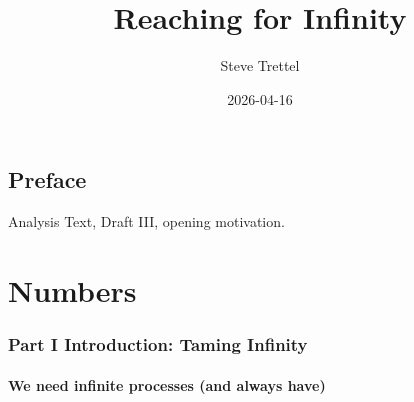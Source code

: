 \documentclass[
  10pt,
  letterpaper,
]{scrbook}
\title{Reaching for Infinity}
\author{Steve Trettel}
\date{2026-04-16}
\renewcommand*\contentsname{Table of contents}
\newcommand\contentsname{Table of contents}
\begin{document}
\frontmatter
\maketitle

\renewcommand*\contentsname{Table of contents}
{
\setcounter{tocdepth}{1}
\tableofcontents
}

\mainmatter
{}

\chapter*{Preface}\label{preface}


Analysis Text, Draft III, opening motivation.

\part{Numbers}

\section*{Part I Introduction: Taming
Infinity}\label{part-i-introduction-taming-infinity}


\subsection*{We need infinite processes (and always
have)}\label{we-need-infinite-processes-and-always-have}
\end{document}
